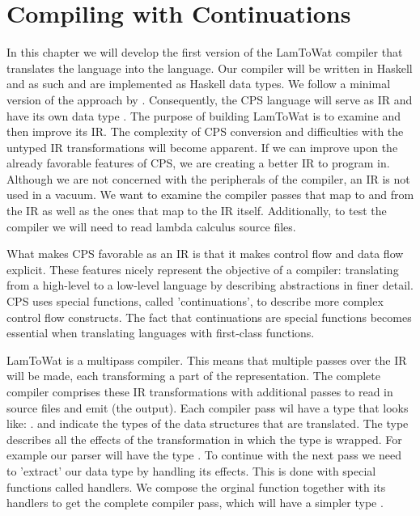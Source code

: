 
\chapter{\label{chap:cpscomp}Compiling with Continuations}

In this chapter we will develop the first version of the LamToWat compiler that translates the  language into the  language. Our compiler will be written in Haskell \autocite{haskellhomepage} and as such  and  are implemented as Haskell data types. We follow a minimal version of the approach by \citeauthor{DBLP:books/daglib/0022396} \autocite{DBLP:books/daglib/0022396}. Consequently, the CPS language will serve as IR and have its own data type . The purpose of building LamToWat is to examine and then improve its IR. The complexity of CPS conversion and difficulties with the untyped IR transformations will become apparent. If we can improve upon the already favorable features of CPS, we are creating a better IR to program in. Although we are not concerned with the peripherals of the compiler, an IR is not used in a vacuum. We want to examine the compiler passes that map to and from the IR as well as the ones that map to the IR itself. Additionally, to test the compiler we will need to read lambda calculus source files.

What makes CPS favorable as an IR is that it makes control flow and data flow explicit. These features nicely represent the objective of a compiler: translating from a high-level to a low-level language by describing abstractions in finer detail. CPS uses special functions, called 'continuations', to describe more complex control flow constructs. The fact that continuations are special functions becomes essential when translating languages with first-class functions.

LamToWat is a multipass compiler. This means that multiple passes over the IR will be made, each transforming a part of the representation. The complete compiler comprises these IR transformations with additional passes to read in source files and emit  (the output). Each compiler pass wil have a type that looks like: .  and  indicate the types of the data structures that are translated. The  type describes all the effects of the transformation in which the  type is wrapped. For example our  parser will have the type . To continue with the next pass we need to 'extract' our data type by handling its effects. This is done with special functions called handlers. We compose the orginal function together with its handlers to get the complete compiler pass, which will have a simpler type .

